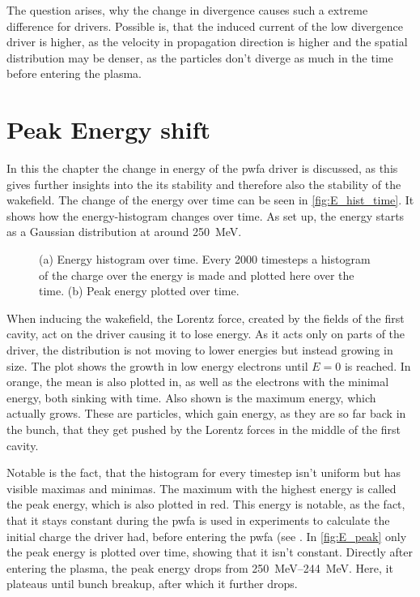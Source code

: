 \documentclass[bachelor_thesis]{subfiles}
\begin{document}
The question arises, why the change in divergence causes such a extreme difference for drivers. Possible is, that the induced current of the low divergence driver is higher, as the velocity in propagation direction is higher and the spatial distribution
may be denser, as the particles don't diverge as much in the time before entering the plasma.

\section{Peak Energy shift}
In this the chapter the change in energy of the \gls{pwfa} driver is discussed, as this gives further insights into the its stability and therefore also the stability of the wakefield.
The change of the energy over time can be seen in \autoref{fig:E_hist_time}. It shows how the energy-histogram changes over time. As set up, the energy starts as a Gaussian distribution at around \qty{250}{\MeV}.
\begin{figure}
	\centering
	\begin{subfigure}{0.5\textwidth}
	\centering
	\missingfigure{}
	\caption{} \label{fig:E_hist_time}
	\end{subfigure}
	\hfill
	\begin{subfigure}{0.5\textwidth}
	\centering
	\missingfigure{}
	\caption{} \label{fig:E_peak}
	\end{subfigure}
	\caption{(a) Energy histogram over time. Every 2000 timesteps a histogram of the charge over the energy is made and plotted here over the time.
	(b) Peak energy plotted over time.}
	\label{fig:Energy}
\end{figure}
When inducing the wakefield, the Lorentz force, created by the fields of the first cavity, act on the driver causing it to lose energy. As it acts only on parts of the driver, the distribution is not moving to lower energies but instead growing in size.
The plot shows the growth in low energy electrons until $E=0$ is reached. In orange, the mean is also plotted in,  as well as the electrons with the minimal energy, both sinking with time. Also shown is the maximum energy, which actually grows.
These are particles, which gain energy, as they are so far back in the bunch, that they get pushed by the Lorentz forces in the middle of the first cavity.

Notable is the fact, that the histogram for every timestep isn't uniform but has visible maximas and minimas. The maximum with the highest energy is called the peak energy, which is also plotted in red.
This energy is notable, as the fact, that it stays constant during the \gls{pwfa} is used in experiments to calculate the initial charge the driver had, before entering the \gls{pwfa} (see \cite{Schoebel2022}.
In \autoref{fig:E_peak} only the peak energy is plotted over time, showing that it isn't constant. Directly after entering the plasma, the peak energy drops from \qtyrange{250}{244}{\MeV}.
Here, it plateaus until bunch breakup, after which it further drops.
\end{document}
